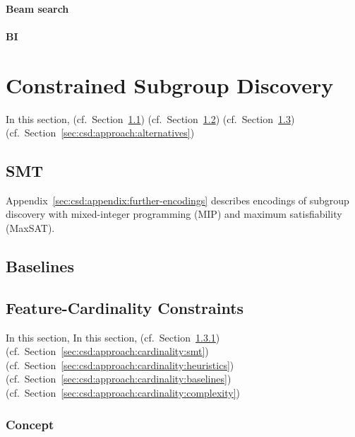\documentclass{article}
\theoremstyle{definition}
\begin{document}
\paragraph{Beam search}

\paragraph{BI}

\section{Constrained Subgroup Discovery}
\label{sec:csd:approach}

In this section, (cf.~Section~\ref{sec:csd:approach:smt}) (cf.~Section~\ref{sec:csd:approach:baselines}) (cf.~Section~\ref{sec:csd:approach:cardinality}) (cf.~Section~\ref{sec:csd:approach:alternatives})

\subsection{SMT}
\label{sec:csd:approach:smt}

Appendix~\ref{sec:csd:appendix:further-encodings} describes encodings of subgroup discovery with mixed-integer programming (MIP) and maximum satisfiability (MaxSAT).

\subsection{Baselines}
\label{sec:csd:approach:baselines}

\subsection{Feature-Cardinality Constraints}
\label{sec:csd:approach:cardinality}

In this section, In this section, (cf.~Section~\ref{sec:csd:approach:cardinality:concept}) (cf.~Section~\ref{sec:csd:approach:cardinality:smt}) (cf.~Section~\ref{sec:csd:approach:cardinality:heuristics}) (cf.~Section~\ref{sec:csd:approach:cardinality:baselines}) (cf.~Section~\ref{sec:csd:approach:cardinality:complexity})

\cite{mosek2022modeling}
\cite{sinz2005towards}
\cite{ulrich2022selecting}

\subsubsection{Concept}
\label{sec:csd:approach:cardinality:concept}
\end{document}
